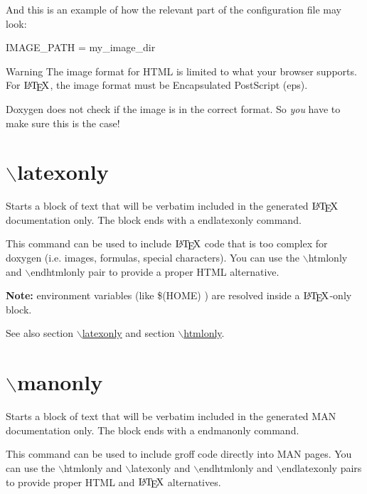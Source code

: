 And this is an example of how the relevant part of the configuration file may look:

\begin{DoxyVerb}
  IMAGE_PATH     = my_image_dir
\end{DoxyVerb}


\begin{DoxyWarning}{Warning}
The image format for HTML is limited to what your browser supports. For $\mbox{\LaTeX}$, the image format must be Encapsulated PostScript (eps). \par
\par
 Doxygen does not check if the image is in the correct format. So {\itshape you\/} have to make sure this is the case!
\end{DoxyWarning}


 \hypertarget{commands_cmdlatexonly}{}\section{$\backslash$latexonly}\label{commands_cmdlatexonly}
 Starts a block of text that will be verbatim included in the generated $\mbox{\LaTeX}$ documentation only. The block ends with a endlatexonly command.

This command can be used to include $\mbox{\LaTeX}$ code that is too complex for doxygen (i.e. images, formulas, special characters). You can use the $\backslash$htmlonly and $\backslash$endhtmlonly pair to provide a proper HTML alternative.

{\bfseries Note:} environment variables (like \$(HOME) ) are resolved inside a $\mbox{\LaTeX}$-\/only block.

\begin{DoxySeeAlso}{See also}
section \hyperlink{commands_cmdlatexonly}{$\backslash$latexonly} and section \hyperlink{commands_cmdhtmlonly}{$\backslash$htmlonly}.
\end{DoxySeeAlso}


 \hypertarget{commands_cmdmanonly}{}\section{$\backslash$manonly}\label{commands_cmdmanonly}
 Starts a block of text that will be verbatim included in the generated MAN documentation only. The block ends with a endmanonly command.

This command can be used to include groff code directly into MAN pages. You can use the $\backslash$htmlonly and $\backslash$latexonly and $\backslash$endhtmlonly and $\backslash$endlatexonly pairs to provide proper HTML and $\mbox{\LaTeX}$ alternatives.

